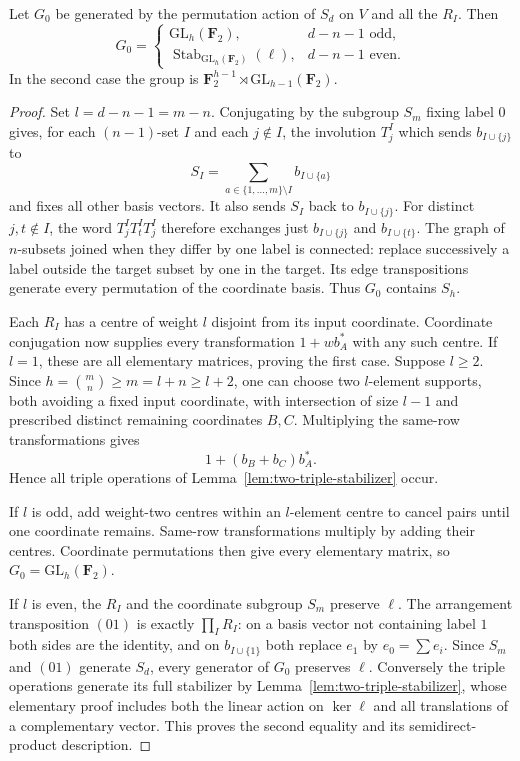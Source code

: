 \begin{proposition}\label{prop:coordinate-generators}
Let $G_0$ be generated by the permutation action of $S_d$ on $V$ and all the $R_I$. Then
\[
G_0=\begin{cases}
\mathrm{GL}_h(\mathbf F_2),&d-n-1\text{ odd},\\
\operatorname{Stab}_{\mathrm{GL}_h(\mathbf F_2)}(\ell),&d-n-1\text{ even}.
\end{cases}
\]
In the second case the group is $\mathbf F_2^{h-1}\rtimes\mathrm{GL}_{h-1}(\mathbf F_2)$.
\end{proposition}
\begin{proof}
Set $l=d-n-1=m-n$. Conjugating by the subgroup $S_m$ fixing label $0$ gives, for each $(n-1)$-set $I$ and each $j\notin I$, the involution $T_j^I$ which sends $b_{I\cup\{j\}}$ to
\[
S_I=\sum_{a\in\{1,\ldots,m\}\setminus I}b_{I\cup\{a\}}
\]
and fixes all other basis vectors. It also sends $S_I$ back to $b_{I\cup\{j\}}$. For distinct $j,t\notin I$, the word $T_j^IT_t^IT_j^I$ therefore exchanges just $b_{I\cup\{j\}}$ and $b_{I\cup\{t\}}$. The graph of $n$-subsets joined when they differ by one label is connected: replace successively a label outside the target subset by one in the target. Its edge transpositions generate every permutation of the coordinate basis. Thus $G_0$ contains $S_h$.

Each $R_I$ has a centre of weight $l$ disjoint from its input coordinate. Coordinate conjugation now supplies every transformation $1+w b_A^*$ with any such centre. If $l=1$, these are all elementary matrices, proving the first case. Suppose $l\ge2$. Since $h=\binom mn\ge m=l+n\ge l+2$, one can choose two $l$-element supports, both avoiding a fixed input coordinate, with intersection of size $l-1$ and prescribed distinct remaining coordinates $B,C$. Multiplying the same-row transformations gives
\[
1+(b_B+b_C)b_A^*.
\]
Hence all triple operations of Lemma~\ref{lem:two-triple-stabilizer} occur.

If $l$ is odd, add weight-two centres within an $l$-element centre to cancel pairs until one coordinate remains. Same-row transformations multiply by adding their centres. Coordinate permutations then give every elementary matrix, so $G_0=\mathrm{GL}_h(\mathbf F_2)$.

If $l$ is even, the $R_I$ and the coordinate subgroup $S_m$ preserve $\ell$. The arrangement transposition $(01)$ is exactly $\prod_I R_I$: on a basis vector not containing label $1$ both sides are the identity, and on $b_{I\cup\{1\}}$ both replace $e_1$ by $e_0=\sum e_i$. Since $S_m$ and $(01)$ generate $S_d$, every generator of $G_0$ preserves $\ell$. Conversely the triple operations generate its full stabilizer by Lemma~\ref{lem:two-triple-stabilizer}, whose elementary proof includes both the linear action on $\ker\ell$ and all translations of a complementary vector. This proves the second equality and its semidirect-product description.
\end{proof}
